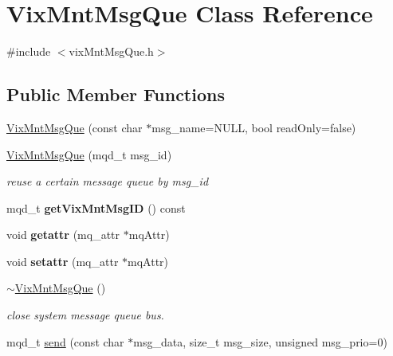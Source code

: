 \hypertarget{class_vix_mnt_msg_que}{}\section{Vix\+Mnt\+Msg\+Que Class Reference}
\label{class_vix_mnt_msg_que}


{\ttfamily \#include $<$vix\+Mnt\+Msg\+Que.\+h$>$}

\subsection*{Public Member Functions}
\begin{DoxyCompactItemize}
\item 
\hyperlink{class_vix_mnt_msg_que_a8b8ee1d568633d791ab05474ebf49139}{Vix\+Mnt\+Msg\+Que} (const char $\ast$msg\+\_\+name=N\+U\+LL, bool read\+Only=false)
\item 
\hyperlink{class_vix_mnt_msg_que_a5ad26c6043aa804ac1358568e76f6f62}{Vix\+Mnt\+Msg\+Que} (mqd\+\_\+t msg\+\_\+id)
\begin{DoxyCompactList}\small\item\em reuse a certain message queue by msg\+\_\+id \end{DoxyCompactList}\item 
\hypertarget{class_vix_mnt_msg_que_a7ea9ff16c3827370402a38afaccd659b}{}\label{class_vix_mnt_msg_que_a7ea9ff16c3827370402a38afaccd659b} 
mqd\+\_\+t {\bfseries get\+Vix\+Mnt\+Msg\+ID} () const
\item 
\hypertarget{class_vix_mnt_msg_que_a70fc5cdb1262614efa4900ffc61c3631}{}\label{class_vix_mnt_msg_que_a70fc5cdb1262614efa4900ffc61c3631} 
void {\bfseries getattr} (mq\+\_\+attr $\ast$mq\+Attr)
\item 
\hypertarget{class_vix_mnt_msg_que_abe4599d03af6800977eec057b383d309}{}\label{class_vix_mnt_msg_que_abe4599d03af6800977eec057b383d309} 
void {\bfseries setattr} (mq\+\_\+attr $\ast$mq\+Attr)
\item 
\hypertarget{class_vix_mnt_msg_que_aade45399f63c69c0d3e2bdbef9a6f06e}{}\label{class_vix_mnt_msg_que_aade45399f63c69c0d3e2bdbef9a6f06e} 
\hyperlink{class_vix_mnt_msg_que_aade45399f63c69c0d3e2bdbef9a6f06e}{$\sim$\+Vix\+Mnt\+Msg\+Que} ()
\begin{DoxyCompactList}\small\item\em close system message queue bus. \end{DoxyCompactList}\item 
mqd\+\_\+t \hyperlink{class_vix_mnt_msg_que_ab5684dff3d3cfa03db2db4856817e951}{send} (const char $\ast$msg\+\_\+data, size\+\_\+t msg\+\_\+size, unsigned msg\+\_\+prio=0)

\end{DoxyCompactItemize}
